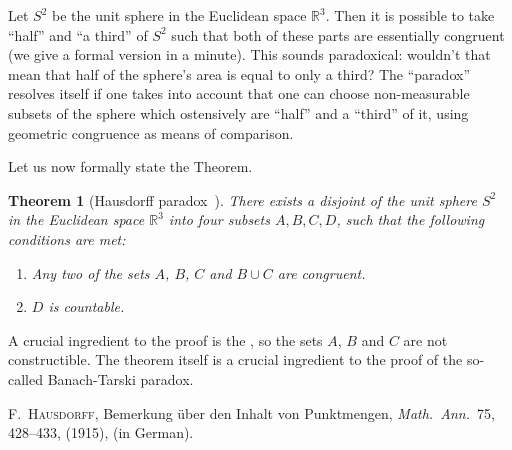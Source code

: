 \documentclass[12pt]{article}
\newcommand{\mbb}{\mathbb}
\begin{document}
Let $S^2$ be the unit sphere in the Euclidean space $\mbb{R}^3$. Then
it is possible to take ``half'' and ``a third'' of $S^2$ such that
both of these parts are essentially congruent (we give a formal
version in a minute). This sounds paradoxical:
wouldn't that mean that half of the sphere's area is equal to only a
third? The ``paradox'' resolves itself if one takes into account that
one can choose non-measurable subsets of the sphere which ostensively are ``half'' and a ``third'' of it, using geometric congruence as means of comparison.

Let us now formally state the Theorem.

\newtheorem*{thm}{Theorem}
\begin{thm}[Hausdorff paradox~\cite{H}]
There exists a disjoint  of the unit sphere $S^2$ in the
Euclidean space $\mbb{R}^3$ into four subsets $A,B,C,D$, such that the
following conditions are met:
\begin{enumerate}
\item Any two of the sets $A$, $B$, $C$ and $B\cup C$ are congruent.
\item $D$ is countable.
\end{enumerate}
\end{thm}

A crucial ingredient to the proof is the , so the
sets $A$, $B$ and $C$ are not constructible. The theorem itself is a
crucial ingredient to the proof of the so-called Banach-Tarski
paradox.

\begin{thebibliography}{H}

 \textsc{F.~Hausdorff}, Bemerkung \"{u}ber den Inhalt von
  Punktmengen, \emph{Math.\ Ann.}\ 75, 428--433, (1915), \texttt{} (in German).

\end{thebibliography}
\end{document}
